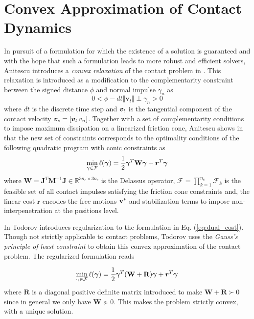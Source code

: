 \section{Convex Approximation of Contact Dynamics}
\label{sec:previous_work}


In pursuit of a formulation for which the existence of a solution is guaranteed
and with the hope that such a formulation leads to more robust and efficient
solvers, Anitescu introduces a \textit{convex relaxation} of the contact problem in
\cite{bib:anitescu2006}. This relaxation is introduced as a modification to the
complementarity constraint between the signed distance $\phi$ and normal impulse
$\gamma_n$ as
\begin{equation}
	0 < \phi - dt \Vert {\bm v}_t \Vert \perp \gamma_n > 0
	\label{eq:convex_relaxation_complementarity_condition}
\end{equation}
where $dt$ is the discrete time step and ${\bm{v}}_t$ is the tangential component
of the contact velocity ${\bm{v}}_c = [{\bm{v}}_t\,v_n]$. Together with a set of
complementarity conditions to impose maximum dissipation on a linearized
friction cone, Anitescu shows in \cite{bib:anitescu2006} that the new set of
constraints corresponds to the optimality conditions of the following quadratic
program with conic constraints as
\begin{eqnarray}
	\min_{\gamma\in \mathcal{F}} \ell(\bgamma) =
	\frac{1}{2}\bgamma^T\mathbf{W}\bgamma + {\bm r}^T
	\bgamma
	\label{eq:dual_cost}
\end{eqnarray}
where $\mathbf{W} =
\mathbf{J}^T\mathbf{M}^{-1}\mathbf{J}\in\mathbb{R}^{3n_c\times 3n_c}$ is the
Delassus operator, $\mathcal{F}=\prod_{k=1}^{n_c}\mathcal{F}_k$ is the feasible
set of all contact impulses satisfying the friction cone constraints and, the
linear cost ${\bm r}$ encodes the free motions ${\mathbf{v}}^*$ and stabilization
terms to impose non-interpenetration at the positions level.

In \cite{bib:todorov2011, bib:todorov2014} Todorov introduces regularization to
the formulation in Eq. (\ref{eq:dual_cost}). Though not strictly applicable to
contact problems, Todorov uses the \textit{Gauss's principle of least
constraint} to obtain this convex approximation of the contact problem. The
regularized formulation reads

\begin{eqnarray}
	\min_{\gamma\in \mathcal{F}} \ell(\bgamma) =
	\frac{1}{2}\bgamma^T(\mathbf{W}+\mathbf{R})\bgamma + {\bm r}^T
	\bgamma
	\label{eq:dual_regularized}
\end{eqnarray}
where $\mathbf{R}$ is a diagonal positive definite matrix introduced to
make $\mathbf{W}+\mathbf{R}\succ 0$ since in general we only have $\mathbf{W}
\succeq 0$. This makes the problem strictly convex, with a unique solution. 

